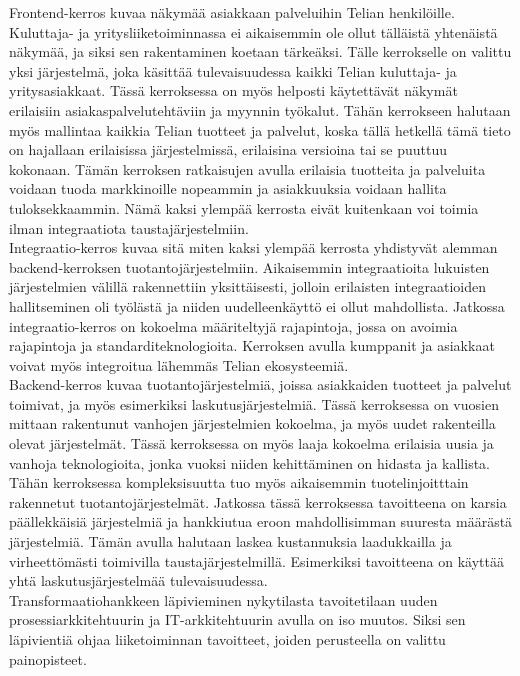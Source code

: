 \documentclass[finnish,12pt,a4paper,pdftex]{article}
\begin{document}
Frontend-kerros kuvaa näkymää asiakkaan palveluihin Telian henkilöille. Kuluttaja- ja yritysliiketoiminnassa ei aikaisemmin ole ollut tälläistä yhtenäistä näkymää, ja siksi sen rakentaminen koetaan tärkeäksi. Tälle kerrokselle on valittu yksi järjestelmä, joka käsittää tulevaisuudessa kaikki Telian kuluttaja- ja yritysasiakkaat. Tässä kerroksessa on myös helposti käytettävät näkymät erilaisiin asiakaspalvelutehtäviin ja myynnin työkalut. Tähän kerrokseen halutaan myös mallintaa kaikkia Telian tuotteet ja palvelut, koska tällä hetkellä tämä tieto on hajallaan erilaisissa järjestelmissä, erilaisina versioina tai se puuttuu kokonaan. Tämän kerroksen ratkaisujen avulla erilaisia tuotteita ja palveluita voidaan tuoda markkinoille nopeammin ja asiakkuuksia voidaan hallita tuloksekkaammin. Nämä kaksi ylempää kerrosta eivät kuitenkaan voi toimia ilman integraatiota taustajärjestelmiin.\\

Integraatio-kerros kuvaa sitä miten kaksi ylempää kerrosta yhdistyvät alemman backend-kerroksen tuotantojärjestelmiin. Aikaisemmin integraatioita lukuisten järjestelmien välillä rakennettiin yksittäisesti, jolloin erilaisten integraatioiden hallitseminen oli työlästä ja niiden uudelleenkäyttö ei ollut mahdollista. Jatkossa integraatio-kerros on kokoelma määriteltyjä rajapintoja, jossa on avoimia rajapintoja ja standarditeknologioita. Kerroksen avulla kumppanit ja asiakkaat voivat myös integroitua lähemmäs Telian ekosysteemiä. \\

Backend-kerros kuvaa tuotantojärjestelmiä, joissa asiakkaiden tuotteet ja palvelut toimivat, ja myös esimerkiksi laskutusjärjestelmiä. Tässä kerroksessa on vuosien mittaan rakentunut vanhojen järjestelmien kokoelma, ja myös uudet rakenteilla olevat järjestelmät. Tässä kerroksessa on myös laaja kokoelma erilaisia uusia ja vanhoja teknologioita, jonka vuoksi niiden kehittäminen on hidasta ja kallista. Tähän kerroksessa kompleksisuutta tuo myös aikaisemmin tuotelinjoitttain rakennetut tuotantojärjestelmät. Jatkossa tässä kerroksessa tavoitteena on karsia päällekkäisiä järjestelmiä ja hankkiutua eroon mahdollisimman suuresta määrästä järjestelmiä. Tämän avulla halutaan laskea kustannuksia laadukkailla ja virheettömästi toimivilla taustajärjestelmillä. Esimerkiksi tavoitteena on käyttää yhtä laskutusjärjestelmää tulevaisuudessa.\\

Transformaatiohankkeen läpivieminen nykytilasta tavoitetilaan uuden prosessiarkkitehtuurin ja IT-arkkitehtuurin avulla on iso muutos. Siksi sen läpivientiä ohjaa liiketoiminnan tavoitteet, joiden perusteella on valittu painopisteet.\\
\end{document}
